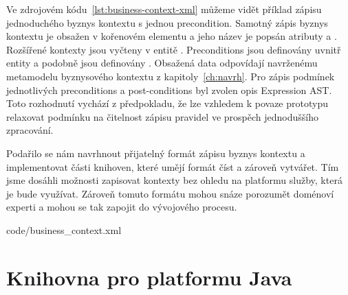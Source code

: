 Ve zdrojovém kódu~\ref{lst:business-context-xml} můžeme vidět
příklad zápisu jednoduchého byznys kontextu s jednou precondition.
Samotný zápis byznys kontextu je obsažen v kořenovém elementu
 a jeho název je popsán atributy
 a . Rozšířené kontexty jsou vyčteny
v entitě . Preconditions jsou
definovány uvnitř entity  a podobně
jsou definovány . Obsažená data odpovídají
navrženému metamodelu byznysového kontextu z kapitoly~\ref{ch:navrh}.
Pro zápis podmínek jednotlivých preconditions a post-conditions byl zvolen
opis Expression \gls{AST}. Toto rozhodnutí vychází z předpokladu,
že lze vzhledem k povaze prototypu relaxovat podmínku
na čitelnost zápisu pravidel ve prospěch jednoduššího zpracování.

Podařilo se nám navrhnout přijatelný formát zápisu byznys kontextu
a implementovat části knihoven, které umějí formát číst a zároveň vytvářet.
Tím jsme dosáhli možnosti zapisovat kontexty bez ohledu na platformu
služby, která je bude využívat. Zároveň tomuto formátu mohou
snáze porozumět doménoví experti a mohou se tak zapojit do
vývojového procesu.


{code/business_context.xml}

\section{Knihovna pro platformu Java}


